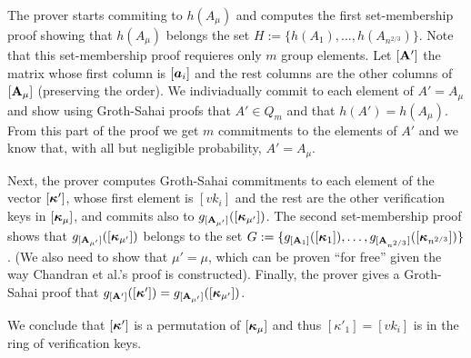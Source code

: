 The prover starts commiting to $h(A_\mu)$ and computes the first set-membership proof showing that $h(A_\mu)$ belongs the set $H:=\{h(A_1),\ldots,\allowbreak h(A_{n^{2/3}})\}$. Note that this set-membership proof requieres only $m$ group elements.
Let $[\mathbf{{A}}']$ the matrix whose first column is $[{\boldsymbol{a}}_i]$ and the rest columns are the other columns of $[\mathbf{{A}}_\mu]$ (preserving the order). We indiviadually commit to each element of $A'=A_\mu$ and show using Groth-Sahai proofs that $A'\in Q_m$ and that $h(A')=h(A_\mu)$. From this part of the proof we get $m$ commitments to the elements of $A'$ and we know that, with all but negligible probability, $A'=A_\mu$.

Next, the prover computes Groth-Sahai commitments to each element of the vector $[{\boldsymbol{\kappa}}']$, whose first element is $[vk_i]$ and the rest are the other verification keys in $[{\boldsymbol{\kappa}}_\mu]$, and commits also to $g_{[\mathbf{{A_{\mu'}}}]}([{\boldsymbol{\kappa}}_{\mu'}])$. The second set-membership proof shows that $g_{[\mathbf{{A_{\mu'}}}]}([{\boldsymbol{\kappa}}_{\mu'}])$ belongs to the set $G:=\{g_{[\mathbf{{A}}_1]}([{\boldsymbol{\kappa}}_1]),\allowbreak\ldots,g_{[\mathbf{{A}}_{n^{2/3}}]}([{\boldsymbol{\kappa}}_{n^{2/3}}])\}$. (We also need to show that $\mu'=\mu$, which can be proven ``for free'' given the way Chandran et al.'s proof is constructed). Finally, the prover gives a Groth-Sahai proof that $g_{[\mathbf{{A}}']}([{\boldsymbol{\kappa}}'])=g_{[\mathbf{{A_{\mu'}}}]}([{\boldsymbol{\kappa}}_{\mu'}])$.

We conclude that $[{\boldsymbol{\kappa}}']$ is a permutation of $[{\boldsymbol{\kappa}}_\mu]$ and thus $[\kappa'_1]=[vk_i]$ is in the ring of verification keys.


